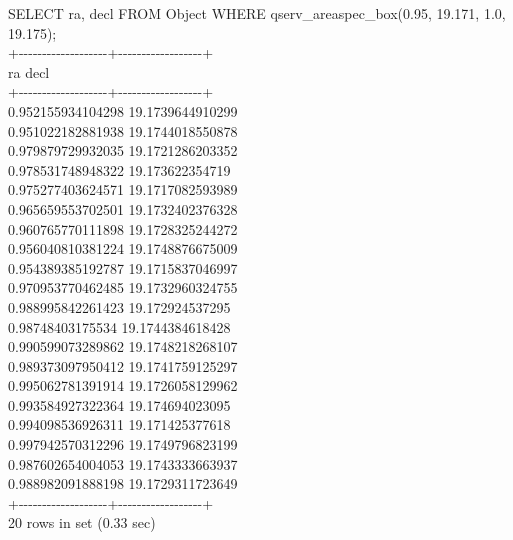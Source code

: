 \documentclass[DM,toc]{lsstdoc}
\begin{document}
SELECT ra, decl FROM Object WHERE qserv\_areaspec\_box(0.95, 19.171,
1.0, 19.175);\\
+-\/-\/-\/-\/-\/-\/-\/-\/-\/-\/-\/-\/-\/-\/-\/-\/-\/-\/-+-\/-\/-\/-\/-\/-\/-\/-\/-\/-\/-\/-\/-\/-\/-\/-\/-\/-+\\
\textbar{} ra \textbar{} decl \textbar{}\\
+-\/-\/-\/-\/-\/-\/-\/-\/-\/-\/-\/-\/-\/-\/-\/-\/-\/-\/-+-\/-\/-\/-\/-\/-\/-\/-\/-\/-\/-\/-\/-\/-\/-\/-\/-\/-+\\
\textbar{} 0.952155934104298 \textbar{} 19.1739644910299 \textbar{}\\
\textbar{} 0.951022182881938 \textbar{} 19.1744018550878 \textbar{}\\
\textbar{} 0.979879729932035 \textbar{} 19.1721286203352 \textbar{}\\
\textbar{} 0.978531748948322 \textbar{} 19.173622354719 \textbar{}\\
\textbar{} 0.975277403624571 \textbar{} 19.1717082593989 \textbar{}\\
\textbar{} 0.965659553702501 \textbar{} 19.1732402376328 \textbar{}\\
\textbar{} 0.960765770111898 \textbar{} 19.1728325244272 \textbar{}\\
\textbar{} 0.956040810381224 \textbar{} 19.1748876675009 \textbar{}\\
\textbar{} 0.954389385192787 \textbar{} 19.1715837046997 \textbar{}\\
\textbar{} 0.970953770462485 \textbar{} 19.1732960324755 \textbar{}\\
\textbar{} 0.988995842261423 \textbar{} 19.172924537295 \textbar{}\\
\textbar{} 0.98748403175534 \textbar{} 19.1744384618428 \textbar{}\\
\textbar{} 0.990599073289862 \textbar{} 19.1748218268107 \textbar{}\\
\textbar{} 0.989373097950412 \textbar{} 19.1741759125297 \textbar{}\\
\textbar{} 0.995062781391914 \textbar{} 19.1726058129962 \textbar{}\\
\textbar{} 0.993584927322364 \textbar{} 19.174694023095 \textbar{}\\
\textbar{} 0.994098536926311 \textbar{} 19.171425377618 \textbar{}\\
\textbar{} 0.997942570312296 \textbar{} 19.1749796823199 \textbar{}\\
\textbar{} 0.987602654004053 \textbar{} 19.1743333663937 \textbar{}\\
\textbar{} 0.988982091888198 \textbar{} 19.1729311723649 \textbar{}\\
+-\/-\/-\/-\/-\/-\/-\/-\/-\/-\/-\/-\/-\/-\/-\/-\/-\/-\/-+-\/-\/-\/-\/-\/-\/-\/-\/-\/-\/-\/-\/-\/-\/-\/-\/-\/-+\\
20 rows in set (0.33 sec)
\end{document}
